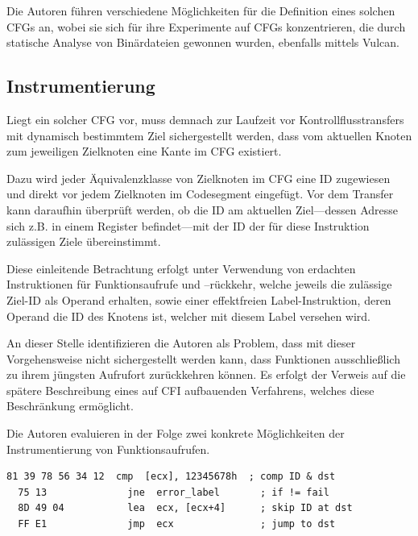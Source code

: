 \documentclass[11pt]{article}
\begin{document}
Die Autoren führen verschiedene Möglichkeiten für die Definition eines solchen
CFGs an, wobei sie sich für ihre Experimente auf CFGs konzentrieren, die durch
statische Analyse von Binärdateien gewonnen wurden, ebenfalls mittels Vulcan.


\subsection{Instrumentierung}

Liegt ein solcher CFG vor, muss demnach zur Laufzeit vor Kontrollflusstransfers
mit dynamisch bestimmtem Ziel sichergestellt werden, dass vom aktuellen Knoten
zum jeweiligen Zielknoten eine Kante im CFG existiert.

Dazu wird jeder Äquivalenzklasse von Zielknoten im CFG eine ID zugewiesen und
direkt vor jedem Zielknoten im Codesegment eingefügt. Vor dem Transfer kann
daraufhin überprüft werden, ob die ID am aktuellen Ziel—dessen Adresse sich
z.B. in einem Register befindet—mit der ID der für diese Instruktion zulässigen
Ziele übereinstimmt.

Diese einleitende Betrachtung erfolgt unter Verwendung von erdachten
Instruktionen für Funktionsaufrufe und –rückkehr, welche jeweils die zulässige
Ziel-ID als Operand erhalten, sowie einer effektfreien Label-Instruktion, deren
Operand die ID des Knotens ist, welcher mit diesem Label versehen wird.

An dieser Stelle identifizieren die Autoren als Problem, dass mit dieser
Vorgehensweise nicht sichergestellt werden kann, dass Funktionen ausschließlich
zu ihrem jüngsten Aufrufort zurückkehren können. Es erfolgt der Verweis auf die
spätere Beschreibung eines auf CFI aufbauenden Verfahrens, welches diese
Beschränkung ermöglicht.

Die Autoren evaluieren in der Folge zwei konkrete Möglichkeiten der
Instrumentierung von Funktionsaufrufen.

\lstset{
  language=[x86masm]Assembler,
  basicstyle=\ttfamily\small,
  frame=lines
}

\begin{lstlisting}[title=Quelle]
  81 39 78 56 34 12  cmp  [ecx], 12345678h  ; comp ID & dst
  75 13              jne  error_label       ; if != fail
  8D 49 04           lea  ecx, [ecx+4]      ; skip ID at dst
  FF E1              jmp  ecx               ; jump to dst
\end{lstlisting}
\end{document}
